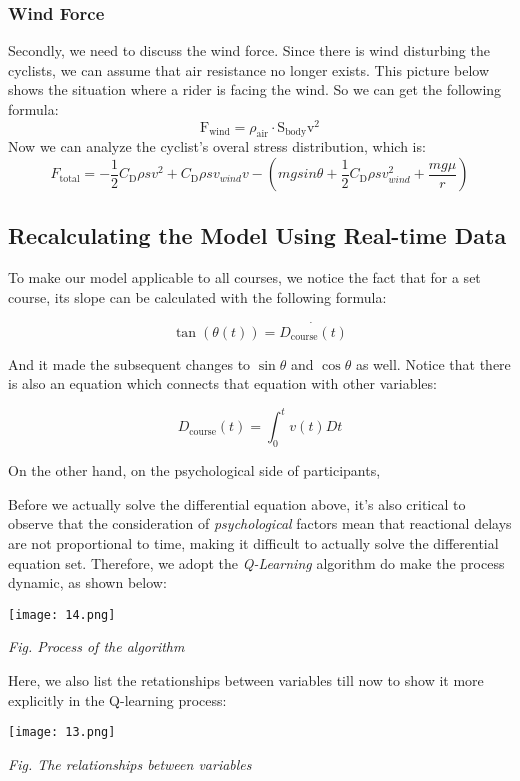 \documentclass[14pt]{article}
\theoremstyle{definition}
\theoremstyle{remark}
\numberwithin{equation}{section}
\begin{document}
	\subsubsection{Wind Force}
	Secondly, we need to discuss the wind force. Since there is wind disturbing the cyclists, we can assume that air resistance no longer exists. This picture below shows the situation where a rider is facing the wind. So we can get the following formula:
	$$\mathrm{F}_\mathrm{wind}=\rho_\mathrm{air}\cdot\mathrm{S}_\mathrm{body}\mathrm{v}^2$$
	Now we can analyze the cyclist's overal stress distribution, which is:
	$$F_\mathrm{total}=-\frac{1}{2}C_\mathrm{D}\rho sv^2+C_\mathrm{D}\rho sv_{wind}v-(mgsin\theta+\frac{1}{2}C_\mathrm{D}\rho sv_{wind}^2+\frac{mg\mu}{r})$$
	\subsection{Recalculating the Model Using Real-time Data}
	To make our model applicable to all courses, we notice the fact that for a set course, its slope can be calculated with the following formula:

	\[ \tan (\theta\left(t\right)) =\dot{D_{\mathrm{course}}\left( t \right) } \]

	And it made the subsequent changes to \( \sin\theta \) and \(\cos \theta\) as well. Notice that there is also an equation which connects that equation with other variables:

	\[ D_{\mathrm{course}}\left( t \right) =\int_0^t{v\left( t \right)  D t} \]

	On the other hand, on the psychological side of participants,

	Before we actually solve the differential equation above, it's also critical to observe that the consideration of \textit{psychological} factors mean that reactional delays are not proportional to time, making it difficult to actually solve the differential equation set. Therefore, we adopt the \textit{Q-Learning} algorithm do make the process dynamic, as shown below:

	\begin{center}
		\texttt{[image: 14.png]}

		\small\textit{Fig. Process of the algorithm}
	\end{center}

	Here, we also list the retationships between variables till now to show it more explicitly in the Q-learning process:\

	\begin{center}
		\texttt{[image: 13.png]}

		\small\textit{Fig. The relationships between variables}
	\end{center}
\end{document}
